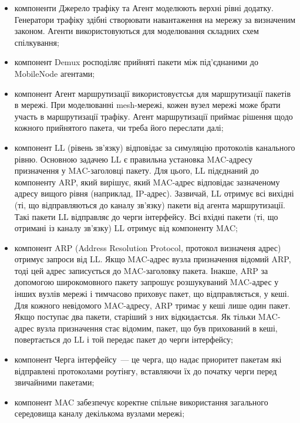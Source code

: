 \documentclass[a4paper,ukrainian,utf8,nocolumnsxix,floatsection,equationsection]{eskdtext}
\begin{document}
\begin{itemize}
	\item компоненти Джерело трафіку та Агент моделюють верхні рівні додатку. Генератори трафіку здібні створювати навантаження на мережу за визначеним законом. Агенти використовуються для моделювання складних схем спілкування;

	\item компонент Demux росподіляє прийняті пакети між під’єднаними до MobileNode агентами;

	\item компонент Агент маршрутизації використовуєтсья для маршрутизації пакетів в мережі. При моделюванні mesh-мережі, кожен вузел мережі може брати участь в маршрутизації трафіку. Агент маршрутизації приймає рішення щодо кожного прийнятого пакета, чи треба його переслати далі;

	\item компонент LL (рівень зв’язку) відповідає за симуляцію протоколів канального рівню. Основною задачею LL є правильна установка MAC-адресу призначення у MAC-заголовці пакету. Для цього, LL підєднаний до компоненту ARP, який вирішує, який MAC-адрес відповідає зазначеному адресу вищого рівня (наприклад, IP-адрес). Зазвичай, LL отримує всі вихідні (ті, що відправляються до каналу зв’язку) пакети від агента маршрутизації. Такі пакети LL відправляє до черги інтерфейсу. Всі вхідні пакети (ті, що отримані із каналу зв’язку) LL отримує від компоненту MAC;

	\item компонент ARP (Address Resolution Protocol, протокол визначеня адрес) отримує запроси від LL. Якщо MAC-адрес вузла призначення відомий ARP, тоді цей адрес записується до MAC-заголовку пакета. Інакше, ARP за допомогою широкомовного пакету запрошує розшукуваний MAC-адрес у інших вузлів мережі і тимчасово приховує пакет, що відправляється, у кеші. Для кожного невідомого MAC-адресу, ARP тримає у кеші лише один пакет. Якщо поступає два пакети, старіший з них відкидаєтсья. Як тільки MAC-адрес вузла призначення стає відомим, пакет, що був прихований в кеші, повертається до LL і той передає пакет до черги інтерфейсу;

	\item компонент Черга інтерфейсу~--- це черга, що надає приоритет пакетам які відправлені протоколами роутінгу, вставляючи їх до початку черги перед звичайними пакетами;

	\item компонент MAC забезпечує коректне спільне використання загального середовища каналу декількома вузлами мережі; 


\end{itemize}
\end{document}
